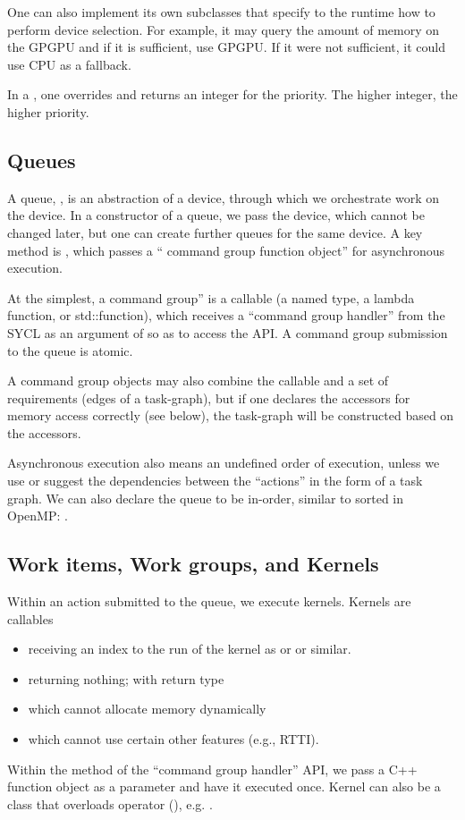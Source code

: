 One can also implement its own subclasses that specify to the runtime how to perform device selection.
For example, it may query the amount of memory on the GPGPU and if it is sufficient, 
use GPGPU. If it were not sufficient, it could use CPU as a fallback. 

In a , one overrides 
and returns an integer for the priority. The higher integer, the higher priority. 

\subsection{Queues}

A queue, , is an abstraction of a device,
through which we orchestrate work on the device.
In a constructor of a queue, we pass the device, which cannot be changed later,
but one can create further queues for the same device.
A key method is ,
which passes a `` command group function object'' for asynchronous execution. 

At the simplest, a command group'' is a callable (a named type, a lambda function, or std::function), which receives a ``command group handler'' from the SYCL as an argument of  so as to access the API. 
A command group submission to the queue is atomic.  

A command group objects may also combine the callable and a set of requirements (edges of a task-graph), but if one declares the accessors for memory access correctly (see below), the task-graph will be constructed based on the accessors. 

Asynchronous execution also means an undefined order of execution, 
unless we use  or suggest the dependencies between the ``actions'' in the form of a task graph.
We can also declare the queue to be in-order, similar to sorted in OpenMP:
.


 \subsection{Work items, Work groups, and Kernels}

Within an action submitted to the queue, we execute kernels.
 Kernels are callables 
 \begin{itemize}
 \item receiving an index to the run of the kernel as  or  or similar.
 \item returning nothing; with  return type 
 \item which cannot allocate memory dynamically
 \item which cannot use certain other features (e.g., RTTI). 
\end{itemize}
Within the  method of the ``command group handler'' API, 
we pass a C++ function object as a parameter and have it executed once. 
Kernel can also be a class that overloads operator (), e.g. .

